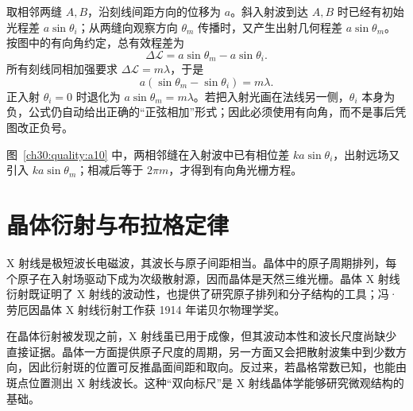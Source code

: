 \begin{xesolution}
\begin{center}\begin{minipage}{.96\linewidth}\centering
{}
\end{minipage}\end{center}

取相邻两缝 $A,B$，沿刻线间距方向的位移为 $a$。斜入射波到达 $A,B$ 时已经有初始光程差 $a\sin\theta_i$；从两缝向观察方向 $\theta_m$ 传播时，又产生出射几何程差 $a\sin\theta_m$。按图中的有向角约定，总有效程差为
\[
 \Delta\mathcal L=a\sin\theta_m-a\sin\theta_i.
\]
所有刻线同相加强要求 $\Delta\mathcal L=m\lambda$，于是
\[
 \boxed{a(\sin\theta_m-\sin\theta_i)=m\lambda}.
\]
正入射 $\theta_i=0$ 时退化为 $a\sin\theta_m=m\lambda$。若把入射光画在法线另一侧，$\theta_i$ 本身为负，公式仍自动给出正确的“正弦相加”形式；因此必须使用有向角，而不是事后凭图改正负号。

图~\ref{ch30:quality:a10} 中，两相邻缝在入射波中已有相位差 $ka\sin\theta_i$，出射远场又引入 $ka\sin\theta_m$；相减后等于 $2\pi m$，才得到有向角光栅方程。
\end{xesolution}




\section{晶体衍射与布拉格定律}



X 射线是极短波长电磁波，其波长与原子间距相当。晶体中的原子周期排列，每个原子在入射场驱动下成为次级散射源，因而晶体是天然三维光栅。晶体 X 射线衍射既证明了 X 射线的波动性，也提供了研究原子排列和分子结构的工具；冯·劳厄因晶体 X 射线衍射工作获 1914 年诺贝尔物理学奖。

在晶体衍射被发现之前，X 射线虽已用于成像，但其波动本性和波长尺度尚缺少直接证据。晶体一方面提供原子尺度的周期，另一方面又会把散射波集中到少数方向，因此衍射斑的位置可反推晶面间距和取向。反过来，若晶格常数已知，也能由斑点位置测出 X 射线波长。这种“双向标尺”是 X 射线晶体学能够研究微观结构的基础。

